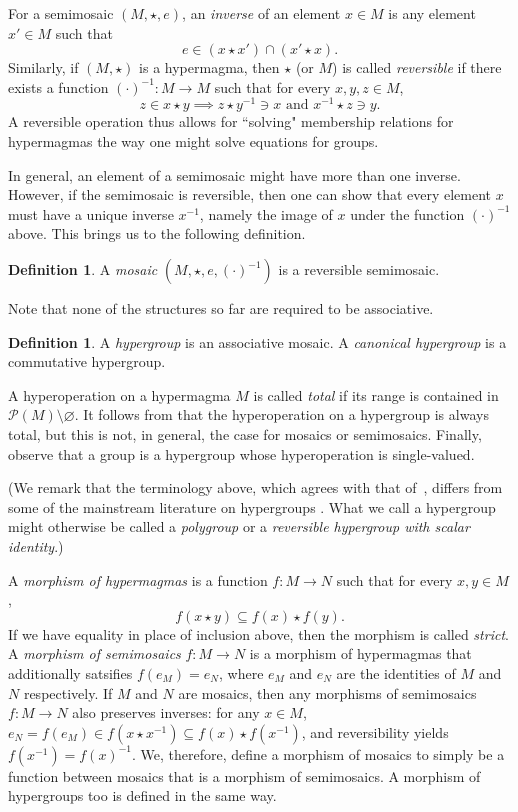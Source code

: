 \documentclass[reqno]{amsart}
\renewcommand{\P}{\mathcal{P}}
\numberwithin{equation}{section}
\theoremstyle{plain}
\theoremstyle{definition}
\newtheorem{definition}[equation]{Definition}
\begin{document}
For a semimosaic $(M, \star, e)$, an \textit{inverse} of an element $x\in M$ is any element $x'\in M$ such that 
$$
e\in (x\star x')  \cap (x'\star x).
$$
Similarly, if $(M, \star)$ is a hypermagma, then $\star$ (or $M$) is called \textit{reversible} if there exists a function $(\cdot)^{-1}:M\to M$ such that for every $x, y, z\in M$,
$$
z\in x\star y \implies z\star y^{-1} \ni x \mbox{ and } x^{-1} \star z \ni y.
$$
A reversible operation thus allows for ``solving" membership relations for hypermagmas the way one might solve equations for groups. 

In general, an element of a semimosaic might have more than one inverse. However, if the semimosaic is reversible, then one can show that every element $x$ must have a unique inverse $x^{-1}$, namely the image of $x$ under the function $(\cdot)^{-1}$ above. This brings us to the following definition.
\begin{definition}
    A \textit{mosaic} $(M, \star, e, (\cdot)^{-1})$ is a reversible semimosaic. 
\end{definition}

Note that none of the structures so far are required to be associative. 

\begin{definition}
    A \textit{hypergroup} is an associative mosaic. A \textit{canonical hypergroup} is a commutative hypergroup.
\end{definition}


A hyperoperation on a hypermagma $M$ is called \textit{total} if its range is contained in $\P(M)\setminus \varnothing$. It follows from \cite[Lemma 2.6]{NakamuraReyes} that the hyperoperation on a hypergroup is always total, but this is not, in general, the case for mosaics or semimosaics. Finally, observe that a group is a hypergroup whose hyperoperation is single-valued.

(We remark that the terminology above, which agrees with that of~\cite{Zieschang}, differs from some of the mainstream literature on hypergroups \cite{CL, Jantosciak, MM}. What we call a hypergroup might otherwise be called a \emph{polygroup} or a \emph{reversible hypergroup with scalar identity}.)



A \textit{morphism of hypermagmas} is a function $f:M\to N$ such that for every $x, y \in M$,
$$
f(x\star y) \subseteq f(x)\star f(y).
$$
If we have equality in place of inclusion above, then the morphism is called \textit{strict}. A \emph{morphism of semimosaics} $f:M\to N$ is a morphism of hypermagmas that additionally satsifies $f(e_M)=e_N$, where $e_M$ and $e_N$ are the identities of $M$ and $N$ respectively. If $M$ and $N$ are mosaics, then any morphisms of semimosaics $f:M\to N$ also preserves inverses: for any $x\in M$, $e_N=f(e_M)\in f(x\star x^{-1})\subseteq f(x)\star f(x^{-1})$, and reversibility yields $f(x^{-1})=f(x)^{-1}$. We, therefore, define a morphism of mosaics to simply be a function between mosaics that is a morphism of semimosaics. A morphism of hypergroups too is defined in the same way. 
\end{document}
